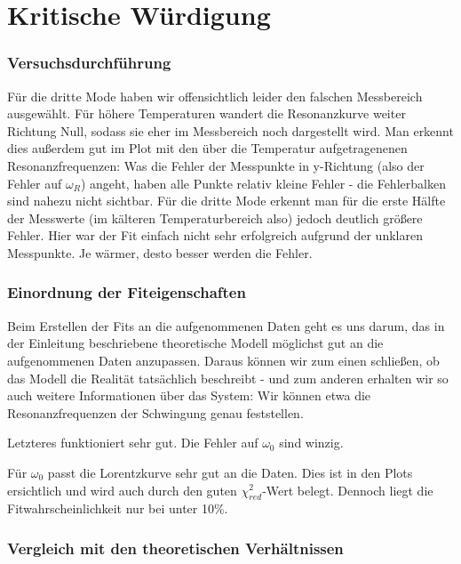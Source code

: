\section{Kritische Würdigung}

\subsubsection*{Versuchsdurchführung}


Für die dritte Mode haben wir offensichtlich leider den falschen Messbereich ausgewählt.
Für höhere Temperaturen wandert die Resonanzkurve weiter Richtung Null, sodass sie eher im Messbereich noch dargestellt wird.
Man erkennt dies außerdem gut im Plot mit den über die Temperatur aufgetragenenen Resonanzfrequenzen:
Was die Fehler der Messpunkte in y-Richtung (also der Fehler auf $\omega_R$) angeht, haben alle Punkte relativ kleine Fehler - die Fehlerbalken sind nahezu nicht sichtbar.
Für die dritte Mode erkennt man für die erste Hälfte der Messwerte (im kälteren Temperaturbereich also) jedoch deutlich größere Fehler.
Hier war der Fit einfach nicht sehr erfolgreich aufgrund der unklaren Messpunkte.
Je wärmer, desto besser werden die Fehler.

\subsubsection*{Einordnung der Fiteigenschaften}


Beim Erstellen der Fits an die aufgenommenen Daten geht es uns darum, das in der Einleitung beschriebene theoretische Modell möglichst gut an die aufgenommenen Daten anzupassen.
Daraus können wir zum einen schließen, ob das Modell die Realität tatsächlich beschreibt - und zum anderen erhalten wir so auch weitere Informationen über das System:
Wir können etwa die Resonanzfrequenzen der Schwingung genau feststellen.

Letzteres funktioniert sehr gut.
Die Fehler auf $\omega_0$ sind winzig.

Für $\omega_{0}$ passt die Lorentzkurve sehr gut an die Daten.
Dies ist in den Plots ersichtlich und wird auch durch den guten $\chi_{red}^2$-Wert belegt.
Dennoch liegt die Fitwahrscheinlichkeit nur bei unter 10\%.

\subsubsection*{Vergleich mit den theoretischen Verhältnissen}

